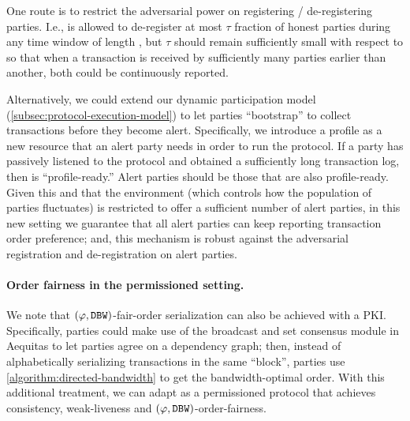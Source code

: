 One route is to restrict the adversarial power on registering / de-registering parties.
%
I.e., \adv is allowed to de-register at most $\tau$ fraction of honest parties during any time window of length \PBWindowLen, but $\tau$ should remain sufficiently small with respect to \PBWindowLen so that when a transaction is received by sufficiently many parties earlier than another, both could be continuously reported.

Alternatively, we could extend our dynamic participation model (\cref{subsec:protocol-execution-model}) to let parties ``bootstrap'' to collect transactions before they become alert.
%
Specifically, we introduce a profile as a new resource that an alert party needs in order to run the protocol.
%
If a party \party has passively listened to the protocol and obtained a sufficiently long transaction log, then \party is ``profile-ready.''
%
Alert parties should be those that are also profile-ready.
%
Given this and that the environment (which controls how the population of parties fluctuates) is restricted to offer a sufficient number of alert parties, in this new setting we guarantee that all alert parties can keep reporting transaction order preference; and, this mechanism is robust against the adversarial registration and de-registration on alert parties.

\paragraph{Order fairness in the permissioned setting.}
%
We note that $(\varphi, \mathtt{DBW})$-fair-order serialization can also be achieved with a PKI.
%
Specifically, parties could make use of the broadcast and set consensus module in \textsf{Aequitas} \cite{C:KZGJ20} to let parties agree on a dependency graph; then, instead of alphabetically serializing transactions in the same ``block'', parties use \cref{algorithm:directed-bandwidth} to get the bandwidth-optimal order.
%
With this additional treatment, we can adapt \Taxis as a permissioned protocol that achieves consistency, weak-liveness and $(\varphi, \mathtt{DBW})$-order-fairness.
